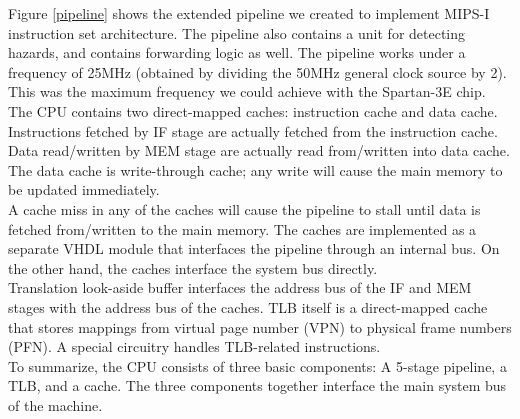 \documentclass[oneside]{book}
\begin{document}
Figure \ref{pipeline}
shows the extended pipeline we created to implement MIPS-I instruction
set architecture. The pipeline also contains a unit for detecting hazards,
and contains forwarding logic as well. The pipeline works under a frequency
of 25MHz (obtained by dividing the 50MHz general clock source by 2). This
was the maximum frequency we could achieve with the Spartan-3E chip.\\

The CPU contains two direct-mapped caches: instruction cache and data cache.
Instructions fetched by IF stage are actually fetched from the instruction
cache. Data read/written by MEM stage are actually read from/written into
data cache. The data cache is write-through cache; any write will cause
the main memory to be updated immediately.\\

A cache miss in any of the caches will cause the pipeline to stall until
data is fetched from/written to the main memory. The caches are implemented
as a separate VHDL module that interfaces the pipeline through an internal
bus. On the other hand, the caches interface the system bus directly.\\

Translation look-aside buffer interfaces the address bus of the IF and MEM
stages with the address bus of the caches. TLB itself is a direct-mapped cache
that stores mappings from virtual page number (VPN) to physical frame numbers
(PFN). A special circuitry handles TLB-related instructions.\\

To summarize, the CPU consists of three basic components: A 5-stage
pipeline, a TLB, and a cache. The three components together interface the main
system bus of the machine.
\end{document}
